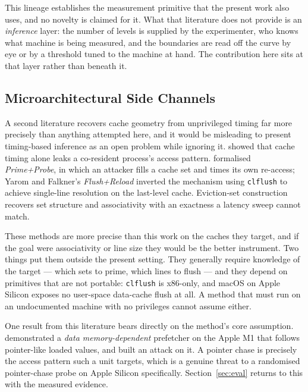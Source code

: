 \documentclass[conference]{IEEEtran}
\begin{document}
This lineage establishes the measurement primitive that the present work also
uses, and no novelty is claimed for it. What that literature does not provide is
an \emph{inference} layer: the number of levels is supplied by the experimenter,
who knows what machine is being measured, and the boundaries are read off the
curve by eye or by a threshold tuned to the machine at hand. The contribution
here sits at that layer rather than beneath it.

\subsection{Microarchitectural Side Channels}

A second literature recovers cache geometry from unprivileged timing far more
precisely than anything attempted here, and it would be misleading to present
timing-based inference as an open problem while ignoring it. \citet{percival2005} showed that cache timing alone leaks a co-resident process's
access pattern. \citet{osvik2006} formalised \emph{Prime+Probe},
in which an attacker fills a cache set and times its own re-access; Yarom and
Falkner's \emph{Flush+Reload} \citep{yarom2014} inverted the mechanism using
\texttt{clflush} to achieve single-line resolution on the last-level cache.
Eviction-set construction \citep{vila2019} recovers set structure and
associativity with an exactness a latency sweep cannot match.

These methods are more precise than this work on the caches they target, and if
the goal were associativity or line size they would be the better instrument. Two
things put them outside the present setting. They generally require knowledge of
the target --- which sets to prime, which lines to flush --- and they
depend on primitives that are not portable: \texttt{clflush} is x86-only, and
macOS on Apple Silicon exposes no user-space data-cache flush at all. A method
that must run on an undocumented machine with no privileges cannot assume either.

One result from this literature bears directly on the method's core assumption.
\citet{vicarte2022} demonstrated a \emph{data memory-dependent}
prefetcher on the Apple M1 that follows pointer-like loaded values, and \citet{chen2024} built an attack on it. A pointer chase is precisely the
access pattern such a unit targets, which is a genuine threat to a randomised
pointer-chase probe on Apple Silicon specifically. Section~\ref{sec:eval} returns
to this with the measured evidence.
\end{document}

